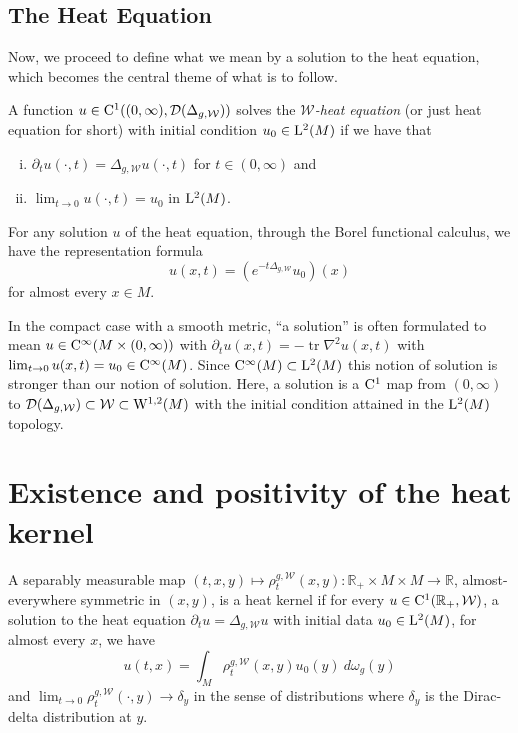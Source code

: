 \documentclass[AMS,STIX1COL]{WileyNJD-v2}
\numberwithin{equation}{section}
\renewcommand{\~}{\tilde}
\renewcommand{\-}{\bar}
\newcommand{\R}{\mathbb{R}}
\newcommand{\8}{\infty}
\newcommand{\cW}{\mathcal{W}}
\newcommand{\mdot}{\cdotp}
\newcommand{\dom}{ {\mathcal{D}}}
\DeclareMathOperator{\tr}{tr}			%
\newcommand{\Lp}[2][{}]{{\rm L}^{#2}_{\rm #1}}		%
\newcommand{\Ck}[2][{}]{{\rm C}^{#2}_{\rm #1}}		%
\newcommand{\Sob}[2][{}]{{\rm W}^{#2}_{\rm #1}}		%
\newcommand{\SobH}[2][{}]{{\Sob[#1]{#2,2}}}	%
\newcommand{\hk}{\rho}
\begin{document}
\subsection{The Heat Equation}

Now, we proceed to define what we mean by a solution to the heat
equation, which becomes the central theme of what is to follow.

\begin{defn}
A function \(u \in \Ck{1}((0,\infty),  \dom(\Delta_{g,\cW}))\) solves the \emph{\(\cW\)-heat equation} (or just heat equation for short) with initial condition $u_0 \in \Lp{2}(M)$ if we have that
\begin{enumerate}[(i)]
\item  $\partial_t u (\cdot, t) = \Delta_{g,\cW} u(\cdot, t)$ for $t \in (0, \infty)$ and 
\item $\lim_{t \to 0} u(\cdot, t) = u_0$ in $\Lp{2}(M)$.
\end{enumerate}
\end{defn}

For any solution \(u\) of the heat equation, through the Borel functional calculus, we have the representation formula
\[
u(x,t) = (e^{-t \Delta_{g,\cW}}u_0)(x)
\]
for almost every $x \in M$.
 
\begin{rem}
In the compact case with a smooth metric, ``a solution'' is often formulated to mean $u \in \Ck{\infty}( M \times (0, \infty))$
with $\partial_t u(x,t) = -\tr \nabla^2 u(x,t)$ with 
$\lim_{t \to 0} u(x,t) = u_0 \in \Ck{\infty}(M)$.
Since $\Ck{\infty}(M) \subset \Lp{2}(M)$ this notion of solution is stronger than our notion of solution. Here, a solution is a $\Ck{1}$ map from $(0, \infty)$ to $\dom(\Delta_{g,\cW}) \subset \cW \subset \SobH{1}(M)$ with the initial condition attained in the $\Lp{2}(M)$ topology.
\end{rem}

\section{Existence and positivity of the heat kernel}

\begin{defn}
A separably measurable map $(t,x,y) \mapsto \hk^{g,\cW}_{t}(x,y): \R_+ \times M \times M \to \R$, 
almost-everywhere symmetric in $(x,y)$, is a heat kernel 
if for every $u \in \Ck{1}(\R_+, \cW)$, a solution to the heat equation 
$\partial_t u = \Delta_{g,\cW}u$ with initial data $u_0 \in \Lp{2}(M)$, for almost every $x$, we have
\[
u(t,x) = \int_{M} \hk^{g,\cW}_t(x,y) u_0(y)\ d\omega_g(y)
\]
and
$\lim_{t \to 0} \hk_t^{g,\cW}(\mdot,y) \to \delta_y$ in the sense of distributions where $\delta_y$ is the Dirac-delta distribution at $y$.
\end{defn}
\end{document}
